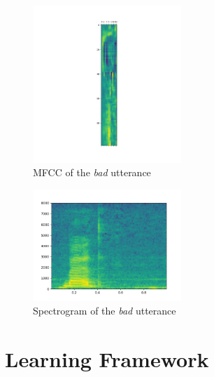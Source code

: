 \begin{figure}
	\centering
	\includegraphics[width=0.5\textwidth]{img/bed_mfcc_plot.png}
	\caption{MFCC of the \textit{bad} utterance}
	\label{fig:bed_mfcc}
\end{figure}


\begin{figure}
	\centering
	\includegraphics[width=0.5\textwidth]{img/bed_specgram_matplotlib.png}
	\caption{Spectrogram of the \textit{bad} utterance}
	\label{fig:bed_specgram}
\end{figure}


\section{Learning Framework}
\label{sec:learning_framework}


